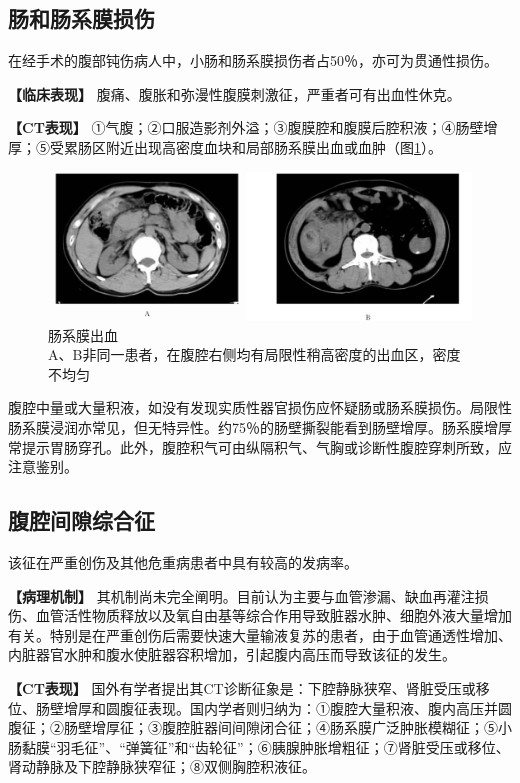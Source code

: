 \subsection{肠和肠系膜损伤}

在经手术的腹部钝伤病人中，小肠和肠系膜损伤者占50％，亦可为贯通性损伤。

\textbf{【临床表现】}
腹痛、腹胀和弥漫性腹膜刺激征，严重者可有出血性休克。

\textbf{【CT表现】}
①气腹；②口服造影剂外溢；③腹膜腔和腹膜后腔积液；④肠壁增厚；⑤受累肠区附近出现高密度血块和局部肠系膜出血或血肿（图\ref{fig20-7}）。

\begin{figure}[!htbp]
 \centering
 \includegraphics[width=.7\textwidth,height=\textheight,keepaspectratio]{./images/Image00396.jpg}
 \captionsetup{justification=centering}
 \caption{肠系膜出血\\{\small A、B非同一患者，在腹腔右侧均有局限性稍高密度的出血区，密度不均匀}}
 \label{fig20-7}
  \end{figure} 

腹腔中量或大量积液，如没有发现实质性器官损伤应怀疑肠或肠系膜损伤。局限性肠系膜浸润亦常见，但无特异性。约75％的肠壁撕裂能看到肠壁增厚。肠系膜增厚常提示胃肠穿孔。此外，腹腔积气可由纵隔积气、气胸或诊断性腹腔穿刺所致，应注意鉴别。

\subsection{腹腔间隙综合征}

该征在严重创伤及其他危重病患者中具有较高的发病率。

\textbf{【病理机制】}
其机制尚未完全阐明。目前认为主要与血管渗漏、缺血再灌注损伤、血管活性物质释放以及氧自由基等综合作用导致脏器水肿、细胞外液大量增加有关。特别是在严重创伤后需要快速大量输液复苏的患者，由于血管通透性增加、内脏器官水肿和腹水使脏器容积增加，引起腹内高压而导致该征的发生。

\textbf{【CT表现】}
国外有学者提出其CT诊断征象是：下腔静脉狭窄、肾脏受压或移位、肠壁增厚和圆腹征表现。国内学者则归纳为：①腹腔大量积液、腹内高压并圆腹征；②肠壁增厚征；③腹腔脏器间间隙闭合征；④肠系膜广泛肿胀模糊征；⑤小肠黏膜“羽毛征”、“弹簧征”和“齿轮征”；⑥胰腺肿胀增粗征；⑦肾脏受压或移位、肾动静脉及下腔静脉狭窄征；⑧双侧胸腔积液征。

